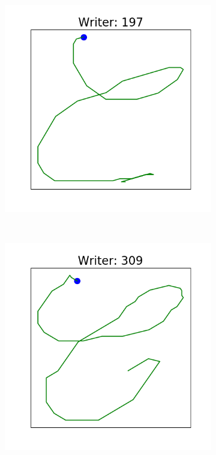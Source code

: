   \begin{figure}[!htbp]
      \centering
      \begin{subfigure}{0.45\textwidth}
          \includegraphics[scale=0.50]{images/framework/C_197.png}
      \end{subfigure}
      ~
      \begin{subfigure}{0.45\textwidth}
          \includegraphics[scale=0.50]{images/framework/C_309.png}

\end{subfigure}
\end{figure}
